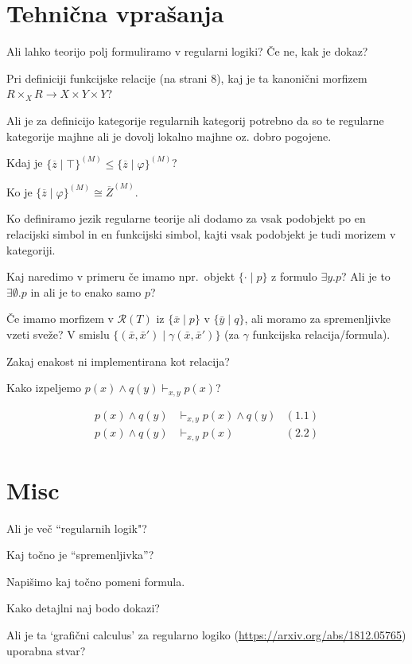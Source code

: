 \documentclass[12pt,a4paper]{article}
\newcommand\ans{\item[\textbf{A:}]}
\newcommand{\set}[1]{\lbrace #1 \rbrace}
\begin{document}
    \section*{Tehnična vprašanja}
    \begin{vprasanja}
        \item Ali lahko teorijo polj formuliramo v regularni logiki? Če ne, kak je dokaz?
        \ans
        \item Pri definiciji funkcijske relacije (na strani 8), kaj je ta kanonični morfizem $R \times_X R \to X \times Y \times Y$?
        \ans
        \item Ali je za definicijo kategorije regularnih kategorij potrebno da so te regularne kategorije majhne ali je dovolj lokalno majhne oz. dobro pogojene.
        \ans
        \item Kdaj je $\lbrace \overline{z} \mid \top \rbrace^{(M)} \leq \lbrace \overline{z} \mid \varphi \rbrace^{(M)}$?
        \ans Ko je $\lbrace \overline{z} \mid \varphi \rbrace^{(M)} \cong \overline{Z}^{(M)}$.
        \item Ko definiramo jezik regularne teorije ali dodamo za vsak podobjekt po en relacijski simbol in en funkcijski simbol,
            kajti vsak podobjekt je tudi morizem v kategoriji.
        \ans
        \item Kaj naredimo v primeru če imamo npr.\ objekt $\lbrace \cdot \mid p \rbrace$ z formulo $\exists y . p$?
            Ali je to $\exists \emptyset . p$ in ali je to enako samo $p$?
        \ans
        \item Če imamo morfizem v $\mathcal{R}(T)$ iz $\set{ \bar{x} \mid p}$ v $\set{ \bar{y} \mid q}$, ali moramo za spremenljivke vzeti sveže?
            V smislu $\set{ (\bar{x}, \bar{x}') \mid \gamma(\bar{x}, \bar{x}')}$ (za $\gamma$ funkcijska relacija/formula).
        \ans
        \item Zakaj enakost ni implementirana kot relacija?
        \ans
        \item Kako izpeljemo $p(x) \wedge q(y) \vdash_{x,y} p(x)$?
        \ans 
            \begin{align*}
               p(x) \wedge q(y) &\vdash_{x,y} p(x) \wedge q(y)  &(1.1) \\
               p(x) \wedge q(y) &\vdash_{x,y} p(x) &(2.2)
            \end{align*}
    \end{vprasanja}

    \section*{Misc}
    \begin{vprasanja}
        \item Ali je več ``regularnih logik"?
        \ans
        \item Kaj točno je ``spremenljivka''?
        \ans
        \item Napišimo kaj točno pomeni formula.
        \ans
        \item Kako detajlni naj bodo dokazi?
        \ans
        \item Ali je ta `grafični calculus' za regularno logiko (\url{https://arxiv.org/abs/1812.05765}) uporabna stvar?
        \ans
    \end{vprasanja}
\end{document}
